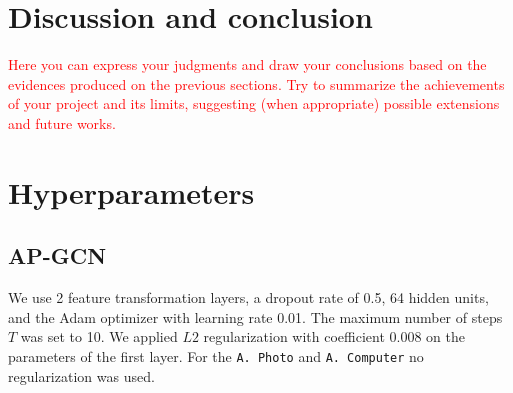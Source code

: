 \documentclass{gdl}
\begin{document}
\section{Discussion and conclusion}

\textcolor{red}{Here you can express your judgments and draw your conclusions based on the  evidences produced on the previous sections.
Try to summarize the achievements of your project and its limits, suggesting (when appropriate) possible extensions and future works.}




\clearpage

\appendix

\section{Hyperparameters}

\subsection{AP-GCN}
\label{lab:hyper-ap-gcn}
We use 2 feature transformation layers, a dropout rate of 0.5, 64 hidden units, and the Adam optimizer with learning rate 0.01. The maximum number of steps $T$ was set to 10. We applied $L2$ regularization with coefficient 0.008 on the parameters of the first layer. For the \texttt{A. Photo} and \texttt{A. Computer} no regularization was used.
\end{document}
